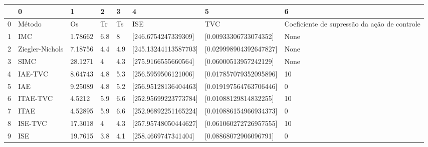 \begin{tabular}{llllllll}
\toprule
{} &                0 &        1 &    2 &    3 &                     4 &                       5 &                                             6 \\
\midrule
0 &           Método &       Os &   Tr &   Ts &                   ISE &                     TVC &  Coeficiente de supressão da ação de controle \\
1 &              IMC &  1.78662 &  6.8 &    8 &   [246.6754247339309] &   [0.00933306733074352] &                                          None \\
2 &  Ziegler-Nichols &  7.18756 &  4.4 &  4.9 &  [245.13244113587703] &  [0.029998904392647827] &                                          None \\
3 &             SIMC &  28.1271 &    4 &  4.3 &   [275.9166555660564] &   [0.06000513957242129] &                                          None \\
4 &          IAE-TVC &  8.64743 &  4.8 &  5.3 &   [256.5959506121006] &  [0.017857079352095896] &                                            10 \\
5 &              IAE &  9.25089 &  4.8 &  5.2 &  [256.95128136404463] &  [0.019197564763706446] &                                             0 \\
6 &         ITAE-TVC &   4.5212 &  5.9 &  6.6 &  [252.95699223773784] &   [0.01088129814832255] &                                            10 \\
7 &             ITAE &  4.52895 &  5.9 &  6.6 &  [252.96892251165224] &  [0.010886154966934373] &                                             0 \\
8 &          ISE-TVC &  17.3018 &    4 &  4.3 &  [257.95748050444627] &  [0.061060272726957555] &                                            10 \\
9 &              ISE &  19.7615 &  3.8 &  4.1 &   [258.4669747341404] &   [0.08868072906096791] &                                             0 \\
\bottomrule
\end{tabular}
